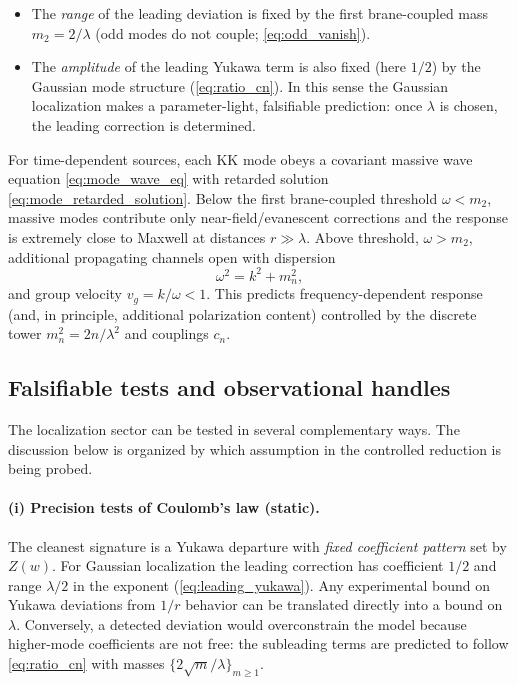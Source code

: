 \documentclass[11pt]{article}
\newcommand{\Z}{Z}
\newcommand{\lam}{\lambda}      %
\begin{document}
\begin{itemize}
\item The \emph{range} of the leading deviation is fixed by the first brane-coupled
mass \(m_2=2/\lam\) (odd modes do not couple; \cref{eq:odd_vanish}).

\item The \emph{amplitude} of the leading Yukawa term is also fixed (here \(1/2\))
by the Gaussian mode structure (\cref{eq:ratio_cn}). In this sense the Gaussian
localization makes a parameter-light, falsifiable prediction: once \(\lam\) is
chosen, the leading correction is determined.
\end{itemize}

For time-dependent sources, each KK mode obeys a covariant massive wave equation
\cref{eq:mode_wave_eq} with retarded solution \cref{eq:mode_retarded_solution}.
Below the first brane-coupled threshold \(\omega<m_2\), massive modes contribute
only near-field/evanescent corrections and the response is extremely close to
Maxwell at distances \(r\gg\lam\). Above threshold, \(\omega>m_2\), additional
propagating channels open with dispersion
\begin{equation}
  \omega^2 = k^2 + m_n^2,
\end{equation}
and group velocity \(v_g = k/\omega < 1\). This predicts frequency-dependent
response (and, in principle, additional polarization content) controlled by the
discrete tower \(m_n^2=2n/\lam^2\) and couplings \(c_n\).

\subsection{Falsifiable tests and observational handles}
The localization sector can be tested in several complementary ways. The
discussion below is organized by which assumption in the controlled reduction is
being probed.

\paragraph{(i) Precision tests of Coulomb's law (static).}
The cleanest signature is a Yukawa departure with \emph{fixed coefficient pattern}
set by \(\Z(w)\). For Gaussian localization the leading correction has coefficient
\(1/2\) and range \(\lam/2\) in the exponent (\cref{eq:leading_yukawa}). Any
experimental bound on Yukawa deviations from \(1/r\) behavior can be translated
directly into a bound on \(\lam\). Conversely, a detected deviation would overconstrain
the model because higher-mode coefficients are not free: the subleading terms are
predicted to follow \cref{eq:ratio_cn} with masses \(\{2\sqrt{m}/\lam\}_{m\ge1}\).
\end{document}
